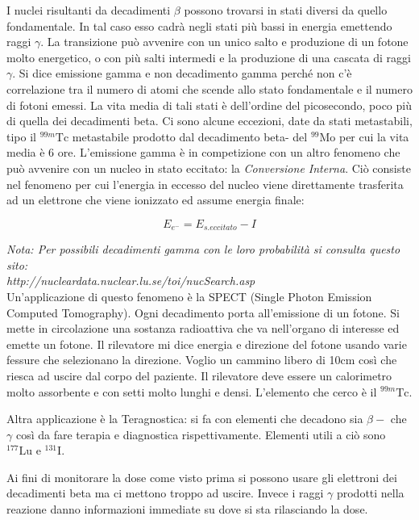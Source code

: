 \documentclass [a4paper, twoside] {book}
\begin{document}
I nuclei risultanti da decadimenti $\beta$ possono trovarsi in stati diversi da quello fondamentale. In tal caso esso cadrà negli stati più bassi in energia emettendo raggi $\gamma$. La transizione può avvenire con un unico salto e produzione di un fotone molto energetico, o con più salti intermedi e la produzione di una cascata di raggi $\gamma$. Si dice emissione gamma e non decadimento gamma perché non c'è correlazione tra il numero di atomi che scende allo stato fondamentale e il numero di fotoni emessi. La vita media di tali stati è dell'ordine del picosecondo, poco più di quella dei decadimenti beta. Ci sono alcune eccezioni, date da stati metastabili, tipo il $^{99m}\text{Tc}$ metastabile prodotto dal decadimento beta- del $^{99}\text{Mo}$ per cui la vita media è 6 ore.
L'emissione gamma è in competizione con un altro fenomeno che può avvenire con un nucleo in stato eccitato: la \emph{Conversione Interna}. Ciò consiste nel fenomeno per cui l'energia in eccesso del nucleo viene direttamente trasferita ad un elettrone che viene ionizzato ed assume energia finale:

\begin{equation}
E_{e^-}=E_{s.eccitato}-I
\end{equation}

\emph{Nota: Per possibili decadimenti gamma con le loro probabilità si consulta questo sito: \\http://nucleardata.nuclear.lu.se/toi/nucSearch.asp }\\

Un'applicazione di questo fenomeno è la SPECT (Single Photon Emission Computed Tomography). Ogni decadimento porta all'emissione di un fotone. Si mette in circolazione una sostanza radioattiva che va nell'organo di interesse ed emette un fotone. Il rilevatore mi dice energia e direzione del fotone usando varie fessure che selezionano la direzione. Voglio un cammino libero di 10cm così che riesca ad uscire dal corpo del paziente. Il rilevatore deve essere un calorimetro molto assorbente e con setti molto lunghi e densi. L'elemento che cerco è il $^{99m}\text{Tc}$.

Altra applicazione è la Teragnostica: si fa con elementi che decadono sia $\beta-$ che $\gamma$ così da fare terapia e diagnostica rispettivamente. Elementi utili a ciò sono $^{177}\text{Lu}$ e $^{131}\text{I}$.

Ai fini di monitorare la dose come visto prima si possono usare gli elettroni dei decadimenti beta ma ci mettono troppo ad uscire. Invece i raggi $\gamma$ prodotti nella reazione danno informazioni immediate su dove si sta rilasciando la dose.
\end{document}
